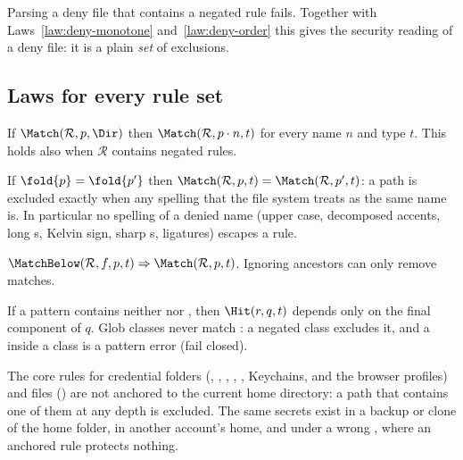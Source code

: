 \begin{law}
\label{law:no-negation}
Parsing a deny file that contains a negated rule fails.  Together with
Laws~\ref{law:deny-monotone} and~\ref{law:deny-order} this gives the security
reading of a deny file: it is a plain \emph{set} of exclusions.
\end{law}

\subsection{Laws for every rule set}

\begin{law}
\label{law:ancestor}
If $\Match(\mathcal R,p,\Dir)$ then $\Match(\mathcal R,p\cdot n,t)$ for every
name $n$ and type $t$.  This holds also when $\mathcal R$ contains negated
rules.
\end{law}

\begin{law}
\label{law:fold-invariance}
If $\fold{p}=\fold{p'}$ then $\Match(\mathcal R,p,t)=\Match(\mathcal R,p',t)$:
a path is excluded exactly when any spelling that the file system treats as the
same name is.  In particular no spelling of a denied name (upper case, decomposed
accents, long s, Kelvin sign, sharp s, ligatures) escapes a rule.
\end{law}

\begin{law}[Narrowing]
\label{law:narrowing}
$\MatchBelow(\mathcal R,f,p,t)\Rightarrow\Match(\mathcal R,p,t)$.  Ignoring
ancestors can only remove matches.
\end{law}

\begin{law}
\label{law:component}
If a pattern contains neither \code{/} nor \code{**}, then $\Hit(r,q,t)$ depends
only on the final component of $q$.  Glob classes never match \code{/}: a
negated class excludes it, and a \code{/} inside a class is a pattern error
(fail closed).
\end{law}

\begin{law}
\label{law:credential-anywhere}
The core rules for credential folders (, , ,
, , Keychains, and the browser profiles) and files
() are not anchored to the current home directory: a path that
contains one of them at any depth is excluded.  The same secrets exist in a
backup or clone of the home folder, in another account's home, and under a wrong
, where an anchored rule protects nothing.
\end{law}

